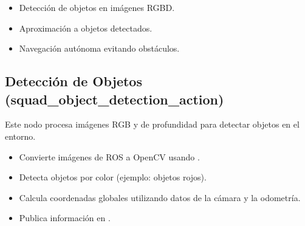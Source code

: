 \documentclass[a4paper,10pt,spanish]{sphinxmanual}
\begin{document}
\sphinxAtStartPar
{}
\begin{itemize}
\item {} 
\sphinxAtStartPar
{} Detección de objetos en imágenes RGBD.

\item {} 
\sphinxAtStartPar
{} Aproximación a objetos detectados.

\item {} 
\sphinxAtStartPar
{} Navegación autónoma evitando obstáculos.

\end{itemize}

\sphinxAtStartPar
{}

\sphinxstepscope


\subsection{Detección de Objetos (squad\_object\_detection\_action)}
\label{\detokenize{squad_object_detection_action:deteccion-de-objetos-squad-object-detection-action}}\label{\detokenize{squad_object_detection_action::doc}}
\sphinxAtStartPar
Este nodo procesa imágenes RGB y de profundidad para detectar objetos en el entorno.

\sphinxAtStartPar
{}
\begin{itemize}
\item {} 
\sphinxAtStartPar
Convierte imágenes de ROS a OpenCV usando .

\item {} 
\sphinxAtStartPar
Detecta objetos por color (ejemplo: objetos rojos).

\item {} 
\sphinxAtStartPar
Calcula coordenadas globales utilizando datos de la cámara y la odometría.

\item {} 
\sphinxAtStartPar
Publica información en .

\end{itemize}
\end{document}
